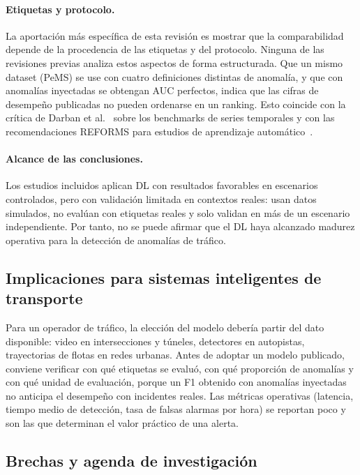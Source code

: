 \documentclass[12pt, a4paper]{article}
\begin{document}
\paragraph{Etiquetas y protocolo.} La aportaci\'{o}n m\'{a}s espec\'{i}fica de esta revisi\'{o}n es mostrar que la comparabilidad depende de la procedencia de las etiquetas y del protocolo. Ninguna de las revisiones previas analiza estos aspectos de forma estructurada. Que un mismo dataset (PeMS) se use con cuatro definiciones distintas de anomal\'{i}a, y que con anomal\'{i}as inyectadas se obtengan AUC perfectos, indica que las cifras de desempe\~{n}o publicadas no pueden ordenarse en un ranking. Esto coincide con la cr\'{i}tica de Darban et al.~\cite{darban2024deep} sobre los benchmarks de series temporales y con las recomendaciones REFORMS para estudios de aprendizaje autom\'{a}tico~\cite{kapoor2024reforms}.

\paragraph{Alcance de las conclusiones.} Los estudios incluidos aplican DL con resultados favorables en escenarios controlados, pero con validaci\'{o}n limitada en contextos reales: \NdatosSimuladosAny{} usan datos simulados, \NetiqNoReales{} no eval\'{u}an con etiquetas reales y solo \QASeissi{} validan en m\'{a}s de un escenario independiente. Por tanto, no se puede afirmar que el DL haya alcanzado madurez operativa para la detecci\'{o}n de anomal\'{i}as de tr\'{a}fico.

\subsection{Implicaciones para sistemas inteligentes de transporte}

Para un operador de tr\'{a}fico, la elecci\'{o}n del modelo deber\'{i}a partir del dato disponible: video en intersecciones y t\'{u}neles, detectores en autopistas, trayectorias de flotas en redes urbanas. Antes de adoptar un modelo publicado, conviene verificar con qu\'{e} etiquetas se evalu\'{o}, con qu\'{e} proporci\'{o}n de anomal\'{i}as y con qu\'{e} unidad de evaluaci\'{o}n, porque un F1 obtenido con anomal\'{i}as inyectadas no anticipa el desempe\~{n}o con incidentes reales. Las m\'{e}tricas operativas (latencia, tiempo medio de detecci\'{o}n, tasa de falsas alarmas por hora) se reportan poco y son las que determinan el valor pr\'{a}ctico de una alerta.

\subsection{Brechas y agenda de investigaci\'{o}n}
\end{document}
